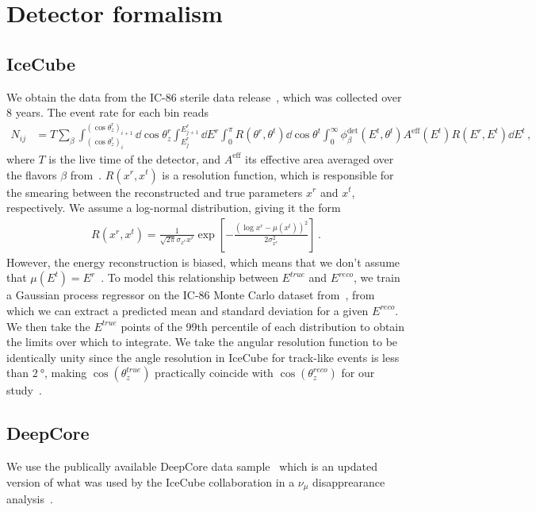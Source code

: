 \documentclass[draft=True]{revtex4-2}
\newcommand{\zreco}{\ensuremath{\cos{(\theta_z^{reco})}}}
\newcommand{\ztrue}{\ensuremath{\cos{(\theta_z^{true})}}}
\newcommand{\Ereco}{E^{reco}}
\newcommand{\Etrue}{E^{true}}
\begin{document}
\section{Detector formalism}
\subsection{IceCube}\label{ch:ICmethod}
We obtain the data from the IC-86 sterile data release~\cite{IC2020}, which was collected over 8 years. The event rate for each bin reads
\begin{align}\label{eq:ICevents}
   N_{ij} &= T\sum_\beta \int_{(\cos{\theta_z^r})_i}^{(\cos{\theta_z^r})_{i+1}} \dd \cos{\theta^r_z} \int_{E^r_{j}}^{E^r_{j+1}} \dd E^r \int_0^\pi R(\theta^r,\theta^t) \dd \cos{\theta^t} \int_0^\infty \phi_\beta^\text{det}(E^t,\theta^t)  A^\text{eff}(E^t) R(E^r,E^t) 
   \dd E^t\,,
\end{align}
where $T$ is the live time of the detector, and $A^\text{eff}$ its effective area averaged over the flavors $\beta$ from~\cite{ICaeff}. $R(x^r,x^t)$ is a resolution function, 
which is responsible for the smearing between the reconstructed and true parameters $x^r$ and $x^t$, respectively. We assume a log-normal distribution, giving it the form 
\begin{align}
    R(x^r, x^t) = \frac{1}{\sqrt{2\pi} \sigma_{x^r}x^r} \exp\left[-\frac{(\log x^r-\mu(x^t))^2}{2\sigma_{x^r}^2}\right]\,.
\end{align}
However, the energy reconstruction is biased, which means that we don't assume that $\mu(E^t) =E^r$~\cite{weaverEvidenceAstrophysicalMuon}. 
To model this relationship between $\Etrue$ and $\Ereco$, we train a Gaussian process regressor on the IC-86 Monte Carlo dataset from~\cite{IC2016}, from which
we can extract a predicted mean and standard deviation for a given $E^{reco}$. We then take the $\Etrue$ points of the 99th percentile of each distribution to obtain
the limits over which to integrate. We take the angular resolution function to be identically unity since the angle resolution in IceCube for track-like 
events is less than $\SI{2}{\degree}$, making $\ztrue$ practically coincide with $\zreco$ for our study~\cite{IC2020}. 

\subsection{DeepCore}\label{ch:DCmethod}
We use the publically available DeepCore data sample~\cite{DC2019data} which is an updated version of what was used by the 
IceCube collaboration in a $\nu_\mu$ disapprearance analysis~\cite{DC2018mudisappearance}.
\end{document}
